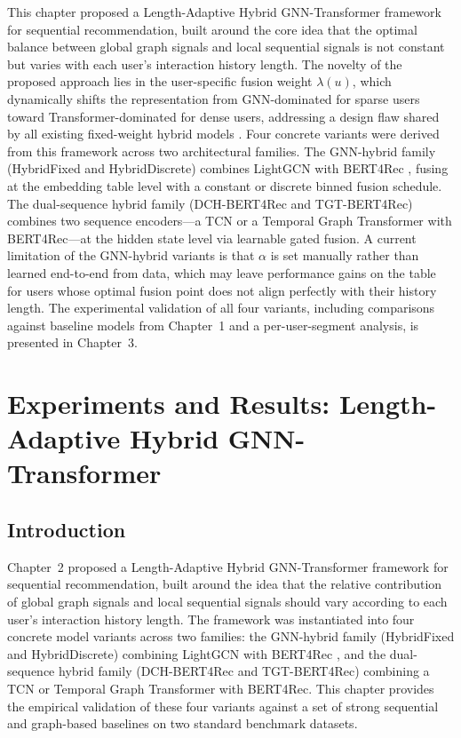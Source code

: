 \documentclass[12pt,a4paper]{report}
\begin{document}
This chapter proposed a Length-Adaptive Hybrid GNN-Transformer framework for
sequential recommendation, built around the core idea that the optimal balance
between global graph signals and local sequential signals is not constant but
varies with each user's interaction history length. The novelty of the proposed
approach lies in the user-specific fusion weight \(\lambda(u)\), which
dynamically shifts the representation from GNN-dominated for sparse users
toward Transformer-dominated for dense users, addressing a design flaw shared
by all existing fixed-weight hybrid models \citep{wu2020gnnsurvey,
pan2024survey}. Four concrete variants were derived from this framework across
two architectural families. The GNN-hybrid family (HybridFixed and
HybridDiscrete) combines LightGCN \citep{he2020lightgcn} with BERT4Rec
\citep{sun2019bert4rec}, fusing at the embedding table level with a constant
or discrete binned fusion schedule. The dual-sequence hybrid family
(DCH-BERT4Rec and TGT-BERT4Rec) combines two sequence encoders---a TCN or a
Temporal Graph Transformer with BERT4Rec---at the hidden state level via
learnable gated fusion. A current limitation of the GNN-hybrid variants is
that \(\alpha\) is set manually rather than learned end-to-end from data, which
may leave performance gains on the table for users whose optimal fusion point
does not align perfectly with their history length. The experimental validation
of all four variants, including comparisons against baseline models from
Chapter~1 and a per-user-segment analysis, is presented in Chapter~3.

\chapter{Experiments and Results: Length-Adaptive Hybrid GNN-Transformer}

\section{Introduction}

Chapter~2 proposed a Length-Adaptive Hybrid GNN-Transformer framework for
sequential recommendation, built around the idea that the relative contribution
of global graph signals and local sequential signals should vary according to
each user's interaction history length. The framework was instantiated into four
concrete model variants across two families: the GNN-hybrid family (HybridFixed
and HybridDiscrete) combining LightGCN \citep{he2020lightgcn} with BERT4Rec
\citep{sun2019bert4rec}, and the dual-sequence hybrid family (DCH-BERT4Rec and
TGT-BERT4Rec) combining a TCN or Temporal Graph Transformer with BERT4Rec. This
chapter provides the empirical validation of these four variants against a set
of strong sequential and graph-based baselines on two standard benchmark
datasets.
\end{document}
